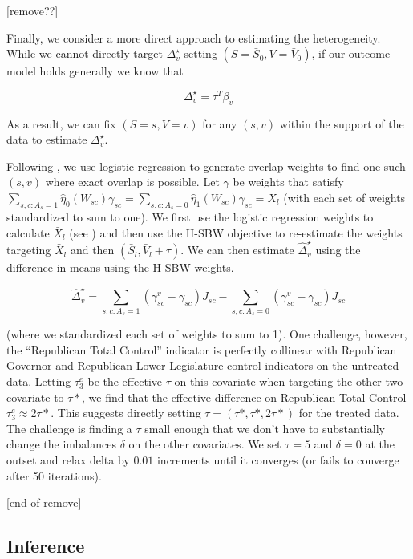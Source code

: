 \documentclass[aoas]{imsart}
\theoremstyle{plain}
\theoremstyle{remark}
\begin{document}
[remove??]

Finally, we consider a more direct approach to estimating the heterogeneity. While we cannot directly target $\Delta^\star_v$ setting $(S = \bar{S}_0, V = \bar{V}_0)$, if our outcome model holds generally we know that

$$
\Delta^\star_v = \tau^T\beta_v
$$

As a result, we can fix $(S = s, V = v)$ for any $(s, v)$ within the support of the data to estimate $\Delta^\star_v$. 

Following \cite{li2018balancing}, we use logistic regression to generate overlap weights to find one such $(s, v)$ where exact overlap is possible. Let $\gamma$ be weights that satisfy $\sum_{s,c: A_s = 1} \hat{\eta}_0(W_{sc})\gamma_{sc} = \sum_{s, c: A_s = 0} \hat{\eta}_1(W_{sc})\gamma_{sc} = \bar{X}_l$ (with each set of weights standardized to sum to one). We first use the logistic regression weights to calculate $\bar{X}_l$ (see \cite{li2018balancing}) and then use the H-SBW objective to re-estimate the weights targeting $\bar{X}_l$ and then $(\bar{S}_l, \bar{V}_l + \tau)$. We can then estimate $\hat{\Delta}^\star_v$ using the difference in means using the H-SBW weights.

$$
\hat{\Delta}^\star_v = \sum_{s,c: A_s = 1}(\gamma_{sc}^v - \gamma_{sc})J_{sc} - \sum_{s,c: A_s = 0}(\gamma_{sc}^v - \gamma_{sc})J_{sc}
$$

(where we standardized each set of weights to sum to 1). One challenge, however, the ``Republican Total Control'' indicator is perfectly collinear with Republican Governor and Republican Lower Legislature control indicators on the untreated data. Letting $\tau^e_3$ be the effective $\tau$ on this covariate when targeting the other two covariate to $\tau*$, we find that the effective difference on Republican Total Control $\tau^e_3 \approx 2\tau*$. This suggests directly setting $\tau = (\tau*, \tau*, 2\tau*)$ for the treated data. The challenge is finding a $\tau$ small enough that we don't have to substantially change the imbalances $\delta$ on the other covariates. We set $\tau = 5$ and $\delta = 0$ at the outset and relax delta by $0.01$ increments until it converges (or fails to converge after 50 iterations).

[end of remove]

\subsection{Inference}
\end{document}
